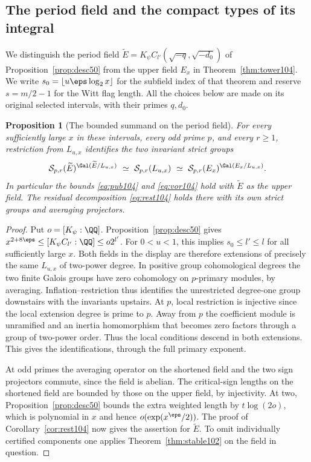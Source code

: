 \documentclass[a4paper,11pt]{article}
\newtheorem{proposition}{Proposition}[section]
\theoremstyle{definition}
\theoremstyle{remark}
\numberwithin{equation}{section}
\begin{document}
\subsection{The period field and the compact types of its integral}\label{nav:VI-25}
We distinguish the period field
\(\widetilde E=K_\psi C_{l'}(\sqrt{-q},\sqrt{-d_0})\) of
Proposition~\ref{prop:desc50} from the upper field \(E_x\) in
Theorem~\ref{thm:tower104}. We write \(s_0=\lfloor u\eps\log_2 x\rfloor\)
for the subfield index of that theorem and reserve \(s=m/2-1\)
for the Witt flag length. All the choices below are made on its
original selected intervals, with their primes \(q,d_0\).

\begin{proposition}[The bounded summand on the period field]\label{prop:short107}
For every sufficiently large \(x\) in these intervals, every odd
prime \(p\), and every \(r\ge1\), restriction from \(L_{u,x}\)
identifies the two invariant strict groups
\[
 \mathcal S_{p,r}(\widetilde E)^{\Gal(\widetilde E/L_{u,x})}
 \ \simeq\ \mathcal S_{p,r}(L_{u,x})\ \simeq\
 \mathcal S_{p,r}(E_x)^{\Gal(E_x/L_{u,x})}.
\]
In particular the bounds \eqref{eq:pub104} and \eqref{eq:vor104}
hold with \(\widetilde E\) as the upper field. The residual
decomposition \eqref{eq:rest104} holds there with its own strict
groups and averaging projectors.
\end{proposition}
\begin{proof}
Put \(o=[K_\psi:\QQ]\). Proposition~\ref{prop:desc50} gives
\(x^{2+8\eps}\le[K_\psi C_{l'}:\QQ]\le o2^{l'}\).
For \(0<u<1\), this implies \(s_0\le l'\le l\) for all
sufficiently large \(x\). Both fields in the display are
therefore extensions of precisely the same \(L_{u,x}\) of
two-power degree. In positive group cohomological degrees the
two finite Galois groups have zero cohomology on \(p\)-primary
modules, by averaging. Inflation--restriction thus identifies
the unrestricted degree-one group downstairs with the invariants
upstairs. At \(p\), local restriction is injective since the
local extension degree is prime to \(p\). Away from \(p\) the
coefficient module is unramified and an inertia homomorphism
that becomes zero factors through a group of two-power order.
Thus the local conditions descend in both extensions. This gives
the identifications, through the full primary exponent.

At odd primes the averaging operator on the shortened field and
the two sign projectors commute, since the field is abelian.
The critical-sign lengths on the shortened field are bounded by
those on the upper field, by injectivity. At two,
Proposition~\ref{prop:desc50} bounds the extra weighted length
by \(t\log(2o)\), which is polynomial in \(x\) and hence
\(o(\exp(x^\eps/2))\). The proof of Corollary~\ref{cor:rest104}
now gives the assertion for \(\widetilde E\). To omit individually
certified components one applies
Theorem~\ref{thm:stable102} on the field in question.
\end{proof}
\end{document}
